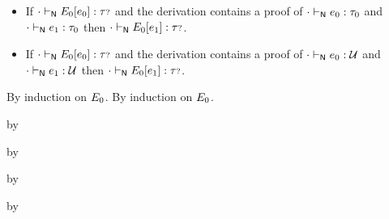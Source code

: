 \begin{lemma}\label{H-type-replacement}\leavevmode
  \begin{itemize}
    \item
      If\/ ${\cdot} \vdash_{\mathsf{N}} E_0[e_0] : {\tau{\scriptstyle ?}}$
      and the derivation contains a proof of\/ ${\cdot} \vdash_{\mathsf{N}} e_0 : \tau_0$
      and\/ ${\cdot} \vdash_{\mathsf{N}} e_1 : \tau_0$
      then\/ ${\cdot} \vdash_{\mathsf{N}} E_0[e_1] : {\tau{\scriptstyle ?}}$.
    \item
      If\/ ${\cdot} \vdash_{\mathsf{N}} E_0[e_0] : {\tau{\scriptstyle ?}}$
      and the derivation contains a proof of\/ ${\cdot} \vdash_{\mathsf{N}} e_0 : {\mathcal U}$
      and\/ ${\cdot} \vdash_{\mathsf{N}} e_1 : {\mathcal U}$
      then\/ ${\cdot} \vdash_{\mathsf{N}} E_0[e_1] : {\tau{\scriptstyle ?}}$.
  \end{itemize}
\end{lemma}{
  \newcommand{\shortproof}{By induction on $\ctx_0$.}
\begin{lamportproof*}
  \shortproof
\mainproof
  \shortproof

    \begin{pfproof}
      \qedstep
    \end{pfproof}

    \begin{pfproof}
      \qedstep
        \begin{pfproof}
          by \pfih
        \end{pfproof}
    \end{pfproof}

    \begin{pfproof}
      \qedstep
        \begin{pfproof}
          by \pfih
        \end{pfproof}
    \end{pfproof}

    \begin{pfproof}
      \qedstep
        \begin{pfproof}
          by \pfih
        \end{pfproof}
    \end{pfproof}

    \begin{pfproof}
      \qedstep
        \begin{pfproof}
          by \pfih
        \end{pfproof}
    \end{pfproof}


\end{lamportproof*}}
